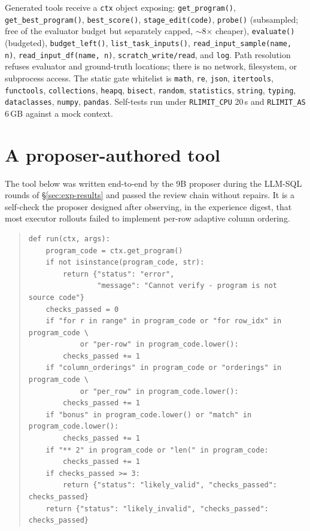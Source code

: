 Generated tools receive a \texttt{ctx} object exposing:
\texttt{get\_program()}, \texttt{get\_best\_program()}, \texttt{best\_score()},
\texttt{stage\_edit(code)}, \texttt{probe()} (subsampled; free of the evaluator budget but separately capped,
$\sim$8$\times$ cheaper), \texttt{evaluate()} (budgeted),
\texttt{budget\_left()}, \texttt{list\_task\_inputs()},
\texttt{read\_input\_sample(name, n)}, \texttt{read\_input\_df(name, n)},
\texttt{scratch\_write/read}, and \texttt{log}.  Path resolution refuses
evaluator and ground-truth locations; there is no network, filesystem, or
subprocess access.  The static gate whitelist is \texttt{math}, \texttt{re},
\texttt{json}, \texttt{itertools}, \texttt{functools}, \texttt{collections},
\texttt{heapq}, \texttt{bisect}, \texttt{random}, \texttt{statistics},
\texttt{string}, \texttt{typing}, \texttt{dataclasses}, \texttt{numpy},
\texttt{pandas}.  Self-tests run under \texttt{RLIMIT\_CPU} 20\,s and
\texttt{RLIMIT\_AS} 6\,GB against a mock context.

\section{A proposer-authored tool}
\label{app:tool-example}

The tool below was written end-to-end by the 9B proposer during the LLM-SQL
rounds of \S\ref{sec:exp-results} and passed the review chain without repairs.
It is a self-check the proposer designed after observing, in the experience
digest, that most executor rollouts failed to implement per-row adaptive
column ordering.

\begin{quote}\footnotesize
\begin{verbatim}
def run(ctx, args):
    program_code = ctx.get_program()
    if not isinstance(program_code, str):
        return {"status": "error",
                "message": "Cannot verify - program is not source code"}
    checks_passed = 0
    if "for r in range" in program_code or "for row_idx" in program_code \
            or "per-row" in program_code.lower():
        checks_passed += 1
    if "column_orderings" in program_code or "orderings" in program_code \
            or "per_row" in program_code.lower():
        checks_passed += 1
    if "bonus" in program_code.lower() or "match" in program_code.lower():
        checks_passed += 1
    if "** 2" in program_code or "len(" in program_code:
        checks_passed += 1
    if checks_passed >= 3:
        return {"status": "likely_valid", "checks_passed": checks_passed}
    return {"status": "likely_invalid", "checks_passed": checks_passed}
\end{verbatim}
\end{quote}

